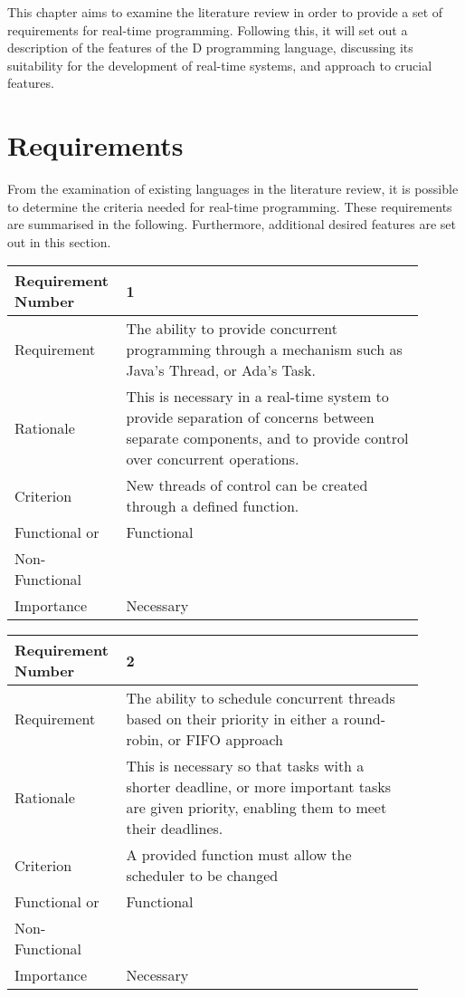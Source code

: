 
This chapter aims to examine the literature review in order to provide a set of 
requirements for real-time programming. Following this, it will set out a 
description of the features of the D programming language, discussing its 
suitability for the development of real-time systems, and approach to crucial 
features.

\section{Requirements}
From the examination of existing languages in the literature review, it is possible 
to determine the criteria needed for real-time programming. These requirements are 
summarised in the following. Furthermore, additional desired features are set out 
in this section. 
\begin{table}[!htbp]
\centering
\begin{tabular}{|L{0.2\linewidth}|L{0.7\linewidth}|}
\hline
Requirement Number & 1 \\ \hline
Requirement & The ability to provide concurrent programming through a 
mechanism such as Java's Thread, or Ada's Task. \\ \hline
Rationale      & This is necessary in a real-time system to provide separation 
of concerns between separate components, and to  provide control over 
concurrent operations. \\ \hline
Criterion      & New threads of control can be created through a defined 
function. \\ \hline
Functional or  & Functional \\
Non-Functional & \\ \hline
Importance     & Necessary \\ \hline
\end{tabular}
\end{table}
\begin{table}[!htbp]
\centering
\begin{tabular}{|L{0.2\linewidth}|L{0.7\linewidth}|}
\hline
Requirement Number & 2 \\ \hline
Requirement & The ability to schedule concurrent threads based on their priority in 
                either a round-robin, or FIFO approach\\ \hline
Rationale      & This is necessary so that tasks with a shorter deadline, or more 
                important tasks are given priority, enabling them to meet their 
                deadlines. \\ \hline
Criterion      & A provided function must allow the scheduler to be changed \\ \hline
Functional or  & Functional \\
Non-Functional & \\ \hline
Importance     & Necessary \\ \hline
\end{tabular}
\end{table}
